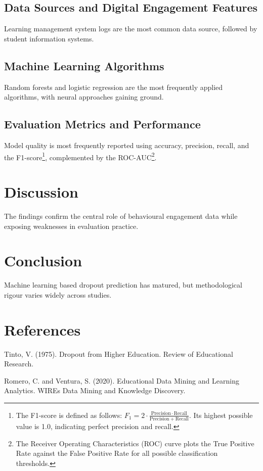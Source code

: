 \documentclass[12pt]{article}
\begin{document}
\subsection{Data Sources and Digital Engagement Features}

Learning management system logs are the most common data source, followed by student information systems.

\subsection{Machine Learning Algorithms}

Random forests and logistic regression are the most frequently applied algorithms, with neural approaches gaining ground.

\subsection{Evaluation Metrics and Performance}

Model quality is most frequently reported using accuracy, precision, recall, and the F1-score\footnote{The F1-score is defined as follows: \(F_1 = 2 \cdot \frac{\mathrm{Precision} \cdot \mathrm{Recall}}{\mathrm{Precision} + \mathrm{Recall}}\). Its highest possible value is 1.0, indicating perfect precision and recall.}, complemented by the ROC-AUC\footnote{The Receiver Operating Characteristics (ROC) curve plots the True Positive Rate against the False Positive Rate for all possible classification thresholds.}.

\section{Discussion}

The findings confirm the central role of behavioural engagement data while exposing weaknesses in evaluation practice.

\section{Conclusion}

Machine learning based dropout prediction has matured, but methodological rigour varies widely across studies.

\section{References}

Tinto, V. (1975). Dropout from Higher Education. Review of Educational Research.

Romero, C. and Ventura, S. (2020). Educational Data Mining and Learning Analytics. WIREs Data Mining and Knowledge Discovery.
\end{document}

